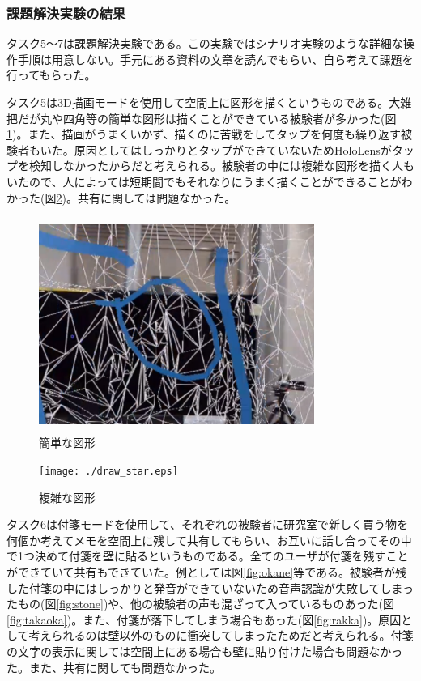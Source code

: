 \documentclass[11pt,a4j, titlepage]{jarticle} %
\begin{document}
\subsubsection{課題解決実験の結果}
タスク5～7は課題解決実験である。この実験ではシナリオ実験のような詳細な操作手順は用意しない。手元にある資料の文章を読んでもらい、自ら考えて課題を行ってもらった。

タスク5は3D描画モードを使用して空間上に図形を描くというものである。大雑把だが丸や四角等の簡単な図形は描くことができている被験者が多かった(図\ref{fig:draw_maru})。また、描画がうまくいかず、描くのに苦戦をしてタップを何度も繰り返す被験者もいた。原因としてはしっかりとタップができていないためHoloLensがタップを検知しなかったからだと考えられる。被験者の中には複雑な図形を描く人もいたので、人によっては短期間でもそれなりにうまく描くことができることがわかった(図\ref{fig:draw_star})。共有に関しては問題なかった。

\begin{figure}[H]
  \begin{center}
    \includegraphics[clip,height=7.0cm,width=9.0cm]{./draw_maru.eps}
    \caption{簡単な図形}
    \label{fig:draw_maru}
  \end{center}
\end{figure}

\begin{figure}[H]
  \begin{center}
    \texttt{[image: ./draw\_star.eps]}
    \caption{複雑な図形}
    \label{fig:draw_star}
  \end{center}
\end{figure}

タスク6は付箋モードを使用して、それぞれの被験者に研究室で新しく買う物を何個か考えてメモを空間上に残して共有してもらい、お互いに話し合ってその中で1つ決めて付箋を壁に貼るというものである。全てのユーザが付箋を残すことができていて共有もできていた。例としては図\ref{fig:okane}等である。被験者が残した付箋の中にはしっかりと発音ができていないため音声認識が失敗してしまったもの(図\ref{fig:stone})や、他の被験者の声も混ざって入っているものあった(図\ref{fig:takaoka})。また、付箋が落下してしまう場合もあった(図\ref{fig:rakka})。原因として考えられるのは壁以外のものに衝突してしまったためだと考えられる。付箋の文字の表示に関しては空間上にある場合も壁に貼り付けた場合も問題なかった。また、共有に関しても問題なかった。
\end{document}

